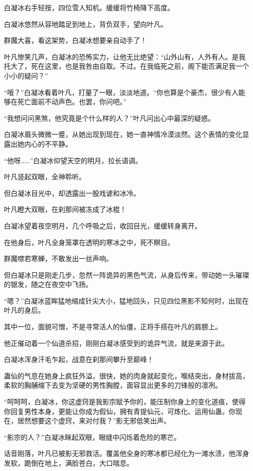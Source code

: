 \begin{this_body}
白凝冰右手轻按，四位雪人知机。缓缓将竹椅降下高度。

白凝冰悠然从容地踏足到地上，背负双手，望向叶凡。

群魔大喜，看这架势，白凝冰想要亲自动手了！

叶凡惨笑几声，白凝冰的恐怖实力，让他无比绝望：“山外山有，人外有人。是我托大了，死在这里，也是我咎由自取。不过。在我临死之前，阁下能否满足我一个小小的疑问？”

“哦？”白凝冰看着叶凡，打量了一眼，淡淡地道。“你也算是个豪杰，很少有人能够在死亡面前不动声色。也罢，你问吧。”

“我想问问黑煞，他究竟是个什么样的人？”叶凡问出心中最深的疑惑。

白凝冰眉头微微一蹙，从她出现到现在，她一直神情冷漠淡然。这个表情的变化显露出她内心的不平静。

“他呀……”白凝冰仰望天空的明月，拉长语调。

叶凡竖起双眼，全神聆听。

但白凝冰目光中，却透露出一股戏谑和冰冷。

叶凡瞪大双眼，在刹那间被冻成了冰棍！

白凝冰望着夜空明月，几个呼吸之后，收回目光，缓缓转身离开。

在他身后，叶凡全身笼罩在透明的寒冰之中，死不瞑目。

群魔噤若寒蝉，不敢发出一丝声响。

但白凝冰只是刚走几步，忽然一阵诡异的黑色气流，从身后传来，带动她一头璀璨的银发，随之在夜空中飞扬。

“嗯？”白凝冰蓝眸猛地缩成针尖大小，猛地回头，只见四位黑影不知何时，出现在叶凡的身后。

其中一位，面貌可憎，不是寻常活人的仙僵，正将手搭在叶凡的肩膀上。

他正催动着一个仙道杀招，刚刚白凝冰感受到的诡异气流，就是来源于此。

白凝冰浑身汗毛乍起，战意在刹那间攀升至巅峰！

蛊仙的气息在她身上疯狂外溢，很快，她的肉身就起变化，喉结突出，身材拔高，柔软的胸脯缩下去变为坚硬的男性胸膛，面容显出更多的刀锋般的凛冽。

“呵呵呵，白凝冰，你这虚窍是我影宗赋予你的，能压制你身上的变化道痕，使得你回复男性本身，更能让你成为假仙，拥有青提仙元，可炼化、运用仙蛊。你现在，居然想要这个虚窍，来对付我？”影无邪低笑出声。

“影宗的人？”白凝冰眯起双眼，眼缝中闪烁着危险的寒芒。

话音刚落，叶凡已被影无邪救活。覆盖他全身的寒冰都已经化为一滩水渍，他浑身发软，跪倒在地上，满脸苍白，大口喘息。


\end{this_body}
